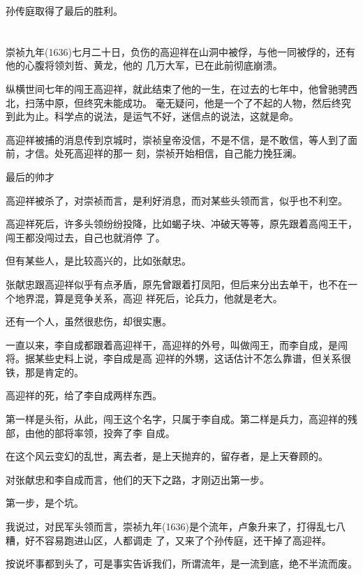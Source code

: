 \documentclass[11pt,a4paper,onecolumn]{article}
\begin{document}
孙传庭取得了最后的胜利。

\section[\thesection]{}

崇祯九年(1636)七月二十日，负伤的高迎祥在山洞中被俘，与他一同被俘的，还有他的心腹将领刘哲、黄龙，他的
几万大军，已在此前彻底崩溃。

纵横世间七年的闯王高迎祥，就此结束了他的一生，在过去的七年中，他曾驰骋西北，扫荡中原，但终究未能成功。
毫无疑问，他是一个了不起的人物，然后终究到此为止。科学点的说法，是运气不好，迷信点的说法，这就是命。

高迎祥被捕的消息传到京城时，崇祯皇帝没信，不是不信，是不敢信，等人到了面前，才信。处死高迎祥的那一
刻，崇祯开始相信，自己能力挽狂澜。

最后的帅才

高迎祥被杀了，对崇祯而言，是利好消息，而对某些头领而言，似乎也不利空。

高迎祥死后，许多头领纷纷投降，比如蝎子块、冲破天等等，原先跟着高闯王干，闯王都没闯过去，自己也就消停
了。

但有某些人，是比较高兴的，比如张献忠。

张献忠跟高迎祥似乎有点矛盾，原先曾跟着打凤阳，但后来分出去单干，也不在一个地界混，算是竞争关系，高迎
祥死后，论兵力，他就是老大。

还有一个人，虽然很悲伤，却很实惠。

一直以来，李自成都跟着高迎祥干，高迎祥的外号，叫做闯王，而李自成，是闯将。据某些史料上说，李自成是高
迎祥的外甥，这话估计不怎么靠谱，但关系很铁，那是肯定的。

高迎祥的死，给了李自成两样东西。

第一样是头衔，从此，闯王这个名字，只属于李自成。第二样是兵力，高迎祥的残部，由他的部将率领，投奔了李
自成。

在这个风云变幻的乱世，离去者，是上天抛弃的，留存者，是上天眷顾的。

对张献忠和李自成而言，他们的天下之路，才刚迈出第一步。

第一步，是个坑。

我说过，对民军头领而言，崇祯九年(1636)是个流年，卢象升来了，打得乱七八糟，好不容易跑进山区，人都调走
了，又来了个孙传庭，还干掉了高迎祥。

按说坏事都到头了，可是事实告诉我们，所谓流年，是一流到底，绝不半流而废。

\section[\thesection]{}
\end{document}
